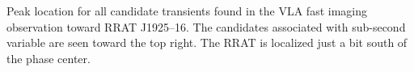 Peak location for all candidate transients found in the VLA fast imaging observation toward RRAT J1925--16. The candidates associated with sub-second variable are seen toward the top right. The RRAT is localized just a bit south of the phase center. 

\label{fig:impeak}